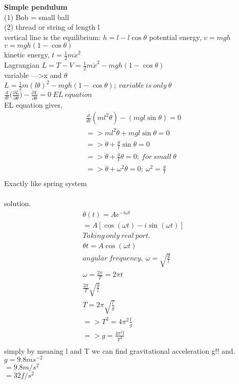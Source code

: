 	
	
	
	
	
	\textbf{Simple pendulum} \\
	(1) Bob = small ball \\
	(2) thread or string of length l \\
	vertical line is the equilibrium: $h = l-l\cos\theta$
	potential energy, $v = mgh$ \\
	$v = mgh(1-\cos\theta)$ \\
	kinetic energy, $t = \frac{1}{2}m\dot{x}^2$ \\
	Lagrangian $L=T-V=\frac{1}{2}m\dot{x}^2-mgh(1-\cos\theta)$ \\
	variable --->x and $\theta$ \\
	$L=\frac{1}{2}m(l\theta)^2 - mgh(1-\cos\theta); \ variable \  is \ only \ \theta$ \\
	$\frac{d}{dt}\bigg(\frac{\partial L}{\partial\theta}\bigg) - \frac{\partial L}{\partial\theta} = 0\  EL \ equation $\\
	EL equation gives, \\
	\begin{align}
		\frac{d}{dt}(ml^2\dot{\theta})- (mgl\sin\theta) = 0 \\
		=>ml^2\ddot{\theta} + mgl\sin\theta = 0 \\
		=>\ddot{\theta} + \frac{g}{l}\sin\theta = 0 \\
		=>\ddot{\theta} + \frac{g}{l}\theta = 0 ;\ for \ small \ \theta \\
		=> \ddot{\theta} + \omega^2\theta = 0 ; \ \omega^2=\frac{g}{l} \\
	\end{align}
	Exactly like spring system \\ \\
	solution. \\
	\begin{align}
		\theta(t) = Ae^{-i\omega t} \\
		= A[\cos(\omega t)- i \sin(\omega t)] \\
		Taking \ only \ real \ port. \\
		\theta t = A\cos(\omega t) \\
		angular \ frequency ,\ \omega = \sqrt{\frac{g}{l}} \\
		\omega = \frac{2\pi}{T} = 2\pi t \\
		\frac{2\pi}{T}\sqrt{\frac{g}{l}} \\
		T = 2\pi\sqrt{\frac{l}{g}} \\
		=> T^2 = 4\pi^2\frac{l}{g} \\
		=> g = \frac{4\pi^2l}{T^2} \\
	\end{align}
	simply by meaning l and T we can find gravitational acceleration g!! and. \\
	$g= 9.8ms^{-2}$ \\
	$= 9.8m/s^2$ \\
	$= 32f/s^2$ \\
	

